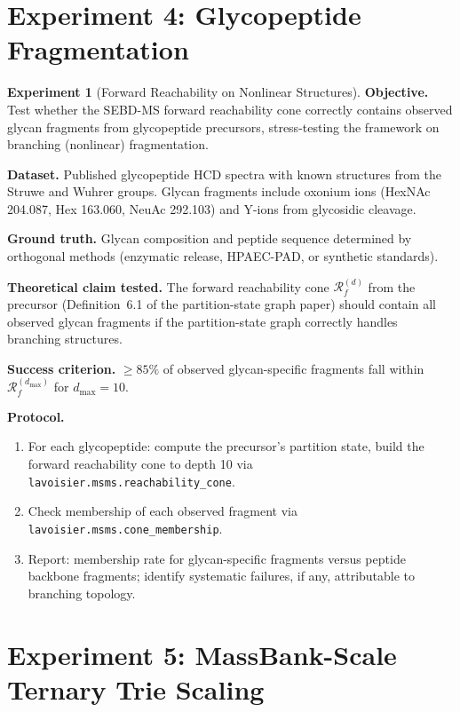 \documentclass[11pt,a4paper]{article}
\theoremstyle{planstyle}
\theoremstyle{definition}
\newtheorem{experiment}[theorem]{Experiment}
\theoremstyle{remark}
\newcommand{\shk}[1]{\texttt{#1}}
\begin{document}
\section{Experiment 4: Glycopeptide Fragmentation}
\label{sec:exp-glyco}

\begin{experiment}[Forward Reachability on Nonlinear Structures]
\label{exp:glyco}
\textbf{Objective.} Test whether the SEBD-MS forward reachability cone
correctly contains observed glycan fragments from glycopeptide
precursors, stress-testing the framework on branching (nonlinear)
fragmentation.

\textbf{Dataset.} Published glycopeptide HCD spectra with known
structures from the Struwe and Wuhrer groups. Glycan fragments include
oxonium ions (HexNAc 204.087, Hex 163.060, NeuAc 292.103) and Y-ions
from glycosidic cleavage.

\textbf{Ground truth.} Glycan composition and peptide sequence
determined by orthogonal methods (enzymatic release, HPAEC-PAD, or
synthetic standards).

\textbf{Theoretical claim tested.} The forward reachability cone
$\mathcal{R}_f^{(d)}$ from the precursor (Definition~6.1 of the
partition-state graph paper) should contain all observed glycan
fragments if the partition-state graph correctly handles branching
structures.

\textbf{Success criterion.} $\geq 85\%$ of observed glycan-specific
fragments fall within $\mathcal{R}_f^{(d_{\max})}$ for $d_{\max} = 10$.

\textbf{Protocol.}
\begin{enumerate}[nosep]
\item For each glycopeptide: compute the precursor's partition state,
  build the forward reachability cone to depth 10 via
  \shk{lavoisier.msms.reachability\_cone}.
\item Check membership of each observed fragment via
  \shk{lavoisier.msms.cone\_membership}.
\item Report: membership rate for glycan-specific fragments versus
  peptide backbone fragments; identify systematic failures, if any,
  attributable to branching topology.
\end{enumerate}
\end{experiment}

\section{Experiment 5: MassBank-Scale Ternary Trie Scaling}
\label{sec:exp-scaling}
\end{document}
